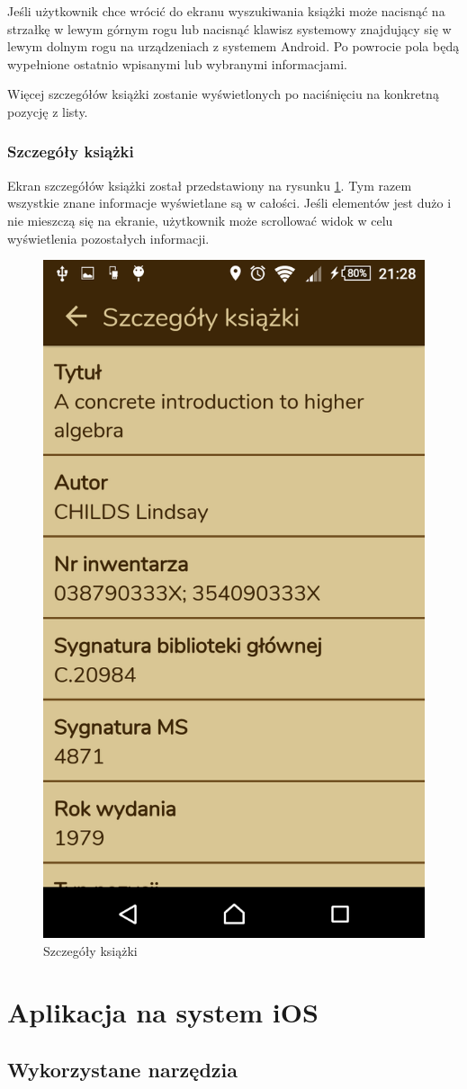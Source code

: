 \documentclass[twoside]{projektInzynierskiMS}
\begin{document}
Jeśli użytkownik chce wrócić do ekranu wyszukiwania książki może nacisnąć na strzałkę w lewym górnym rogu lub nacisnąć klawisz systemowy znajdujący się w lewym dolnym rogu na urządzeniach z systemem Android. Po powrocie pola będą wypełnione ostatnio wpisanymi lub wybranymi informacjami.

Więcej szczegółów książki zostanie wyświetlonych po naciśnięciu na konkretną pozycję z listy. 

\subsubsection{Szczegóły książki}

Ekran szczegółów książki został przedstawiony na rysunku \ref{fig:anroidBookDetails}. Tym razem wszystkie znane informacje wyświetlane są w całości. Jeśli elementów jest dużo i nie mieszczą się na ekranie, użytkownik może scrollować widok w celu wyświetlenia pozostałych informacji.

\begin{figure}[h]
  \centering
  \includegraphics[width=0.4\linewidth]{img/android/android8.png}
  \caption{Szczegóły książki}
  \label{fig:anroidBookDetails}
\end{figure}



\section{Aplikacja na system iOS}

\subsection{Wykorzystane narzędzia}
\end{document}
